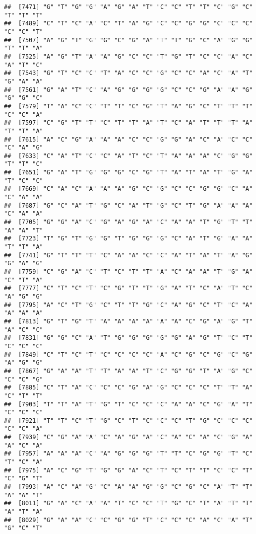 \documentclass[
]{article}
\begin{document}
\begin{verbatim}
##  [7471] "G" "T" "G" "G" "A" "G" "A" "T" "C" "C" "T" "T" "C" "G" "C" "T" "T" "T"
##  [7489] "C" "T" "C" "A" "C" "T" "A" "G" "C" "C" "G" "G" "C" "C" "C" "C" "C" "T"
##  [7507] "A" "G" "T" "G" "G" "C" "G" "A" "T" "T" "G" "C" "A" "G" "G" "T" "T" "A"
##  [7525] "A" "G" "T" "A" "A" "G" "C" "C" "T" "G" "T" "C" "C" "A" "C" "A" "T" "C"
##  [7543] "G" "T" "C" "C" "T" "A" "C" "C" "G" "C" "C" "A" "C" "A" "T" "G" "A" "A"
##  [7561] "G" "A" "T" "C" "A" "G" "G" "G" "G" "C" "C" "G" "A" "A" "G" "G" "G" "C"
##  [7579] "T" "A" "C" "C" "T" "T" "C" "G" "T" "A" "G" "C" "T" "T" "T" "C" "C" "A"
##  [7597] "C" "G" "T" "T" "C" "T" "T" "A" "T" "C" "A" "T" "T" "T" "A" "T" "T" "A"
##  [7615] "A" "C" "G" "A" "A" "A" "C" "C" "G" "G" "A" "C" "A" "C" "C" "C" "A" "G"
##  [7633] "C" "A" "T" "C" "C" "A" "T" "C" "T" "A" "A" "A" "C" "G" "G" "T" "T" "C"
##  [7651] "G" "A" "T" "G" "G" "G" "C" "G" "T" "A" "T" "A" "T" "G" "A" "T" "C" "C"
##  [7669] "C" "A" "C" "A" "A" "A" "G" "C" "G" "C" "C" "G" "G" "C" "A" "C" "A" "A"
##  [7687] "G" "C" "A" "T" "G" "C" "A" "T" "G" "C" "T" "G" "A" "A" "A" "C" "A" "A"
##  [7705] "G" "G" "A" "C" "G" "A" "G" "A" "C" "A" "A" "T" "G" "T" "T" "A" "A" "T"
##  [7723] "T" "G" "T" "G" "G" "T" "G" "G" "G" "C" "A" "T" "G" "A" "A" "T" "T" "A"
##  [7741] "G" "T" "T" "T" "C" "A" "A" "C" "C" "A" "T" "A" "T" "A" "G" "G" "A" "G"
##  [7759] "C" "G" "A" "C" "T" "C" "T" "T" "A" "C" "A" "A" "T" "G" "A" "C" "T" "A"
##  [7777] "C" "T" "C" "T" "C" "G" "T" "T" "G" "A" "T" "C" "A" "T" "C" "A" "G" "G"
##  [7795] "A" "C" "T" "G" "C" "T" "T" "G" "C" "A" "G" "C" "T" "C" "A" "A" "A" "A"
##  [7813] "G" "T" "G" "T" "A" "A" "A" "A" "A" "A" "C" "G" "A" "G" "T" "A" "C" "C"
##  [7831] "G" "G" "C" "A" "T" "G" "G" "G" "G" "G" "A" "G" "T" "C" "T" "C" "C" "C"
##  [7849] "C" "T" "C" "T" "C" "C" "C" "C" "A" "C" "G" "C" "G" "C" "G" "A" "G" "G"
##  [7867] "G" "A" "A" "T" "T" "A" "A" "T" "C" "G" "G" "T" "A" "G" "C" "C" "C" "G"
##  [7885] "C" "T" "A" "C" "C" "C" "G" "A" "G" "C" "C" "C" "T" "T" "A" "C" "T" "T"
##  [7903] "T" "T" "A" "T" "G" "T" "C" "C" "C" "A" "A" "C" "G" "A" "T" "C" "C" "C"
##  [7921] "T" "T" "C" "T" "G" "C" "T" "C" "C" "C" "T" "G" "C" "C" "C" "C" "C" "A"
##  [7939] "C" "G" "A" "A" "C" "A" "G" "A" "C" "A" "C" "A" "C" "G" "A" "A" "C" "A"
##  [7957] "A" "A" "A" "C" "A" "G" "G" "G" "T" "T" "C" "G" "G" "T" "C" "T" "C" "A"
##  [7975] "A" "C" "G" "T" "G" "G" "A" "C" "T" "C" "T" "T" "C" "C" "T" "C" "G" "T"
##  [7993] "A" "C" "A" "G" "C" "A" "A" "G" "G" "C" "G" "C" "A" "T" "T" "A" "A" "T"
##  [8011] "G" "A" "C" "A" "A" "T" "C" "C" "T" "G" "C" "T" "A" "T" "T" "A" "T" "A"
##  [8029] "G" "A" "A" "C" "C" "G" "G" "T" "C" "C" "C" "A" "C" "A" "T" "G" "C" "T"

\end{verbatim}
\end{document}
